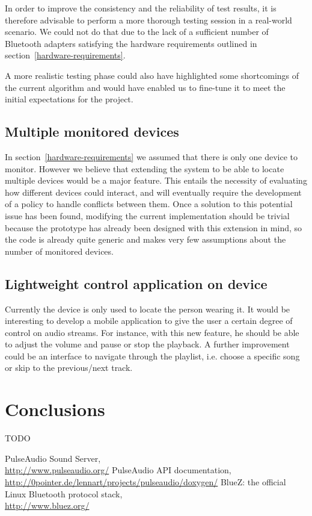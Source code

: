 \documentclass[conference]{IEEEtran}
\begin{document}
In order to improve the consistency and the reliability of test results, it is therefore advisable to perform a more thorough testing session in a real-world scenario. We could not do that due to the lack of a sufficient number of Bluetooth adapters satisfying the hardware requirements outlined in section~\ref{hardware-requirements}.

A more realistic testing phase could also have highlighted some shortcomings of the current algorithm and would have enabled us to fine-tune it to meet the initial expectations for the project.

\subsection{Multiple monitored devices}
In section~\ref{hardware-requirements} we assumed that there is only one device to monitor. However we believe that extending the system to be able to locate multiple devices would be a major feature. This entails the necessity of evaluating how different devices could interact, and will eventually require the development of a policy to handle conflicts between them. Once a solution to this potential issue has been found, modifying the current implementation should be trivial because the prototype has already been designed with this extension in mind, so the code is already quite generic and makes very few assumptions about the number of monitored devices.

\subsection{Lightweight control application on device}
Currently the device is only used to locate the person wearing it. It would be interesting to develop a mobile application to give the user a certain degree of control on audio streams. For instance, with this new feature, he should be able to adjust the volume and pause or stop the playback. A further improvement could be an interface to navigate through the playlist, i.e. choose a specific song or skip to the previous/next track.


\section{Conclusions}
TODO


\begin{thebibliography}{1}
	PulseAudio Sound Server,\\
	\url{http://www.pulseaudio.org/}
	PulseAudio API documentation,\\
	\url{http://0pointer.de/lennart/projects/pulseaudio/doxygen/}
	BlueZ: the official Linux Bluetooth protocol stack,\\
	\url{http://www.bluez.org/}
\end{thebibliography}
\end{document}
